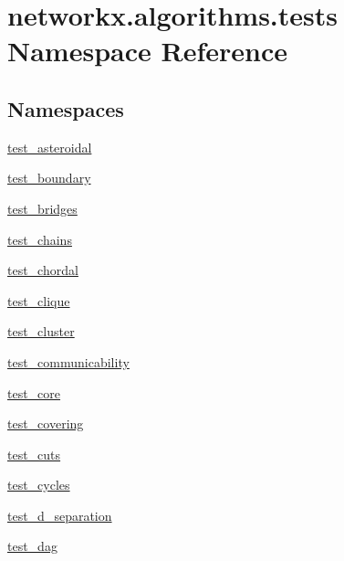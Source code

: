 \hypertarget{namespacenetworkx_1_1algorithms_1_1tests}{}\section{networkx.\+algorithms.\+tests Namespace Reference}
\label{namespacenetworkx_1_1algorithms_1_1tests}
\subsection*{Namespaces}
\begin{DoxyCompactItemize}
\item 
 \hyperlink{namespacenetworkx_1_1algorithms_1_1tests_1_1test__asteroidal}{test\+\_\+asteroidal}
\item 
 \hyperlink{namespacenetworkx_1_1algorithms_1_1tests_1_1test__boundary}{test\+\_\+boundary}
\item 
 \hyperlink{namespacenetworkx_1_1algorithms_1_1tests_1_1test__bridges}{test\+\_\+bridges}
\item 
 \hyperlink{namespacenetworkx_1_1algorithms_1_1tests_1_1test__chains}{test\+\_\+chains}
\item 
 \hyperlink{namespacenetworkx_1_1algorithms_1_1tests_1_1test__chordal}{test\+\_\+chordal}
\item 
 \hyperlink{namespacenetworkx_1_1algorithms_1_1tests_1_1test__clique}{test\+\_\+clique}
\item 
 \hyperlink{namespacenetworkx_1_1algorithms_1_1tests_1_1test__cluster}{test\+\_\+cluster}
\item 
 \hyperlink{namespacenetworkx_1_1algorithms_1_1tests_1_1test__communicability}{test\+\_\+communicability}
\item 
 \hyperlink{namespacenetworkx_1_1algorithms_1_1tests_1_1test__core}{test\+\_\+core}
\item 
 \hyperlink{namespacenetworkx_1_1algorithms_1_1tests_1_1test__covering}{test\+\_\+covering}
\item 
 \hyperlink{namespacenetworkx_1_1algorithms_1_1tests_1_1test__cuts}{test\+\_\+cuts}
\item 
 \hyperlink{namespacenetworkx_1_1algorithms_1_1tests_1_1test__cycles}{test\+\_\+cycles}
\item 
 \hyperlink{namespacenetworkx_1_1algorithms_1_1tests_1_1test__d__separation}{test\+\_\+d\+\_\+separation}
\item 
 \hyperlink{namespacenetworkx_1_1algorithms_1_1tests_1_1test__dag}{test\+\_\+dag}
\item 

\end{DoxyCompactItemize}
